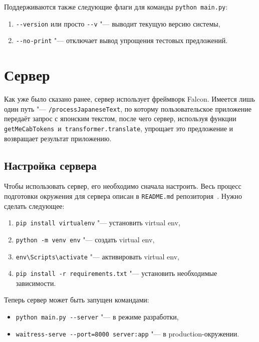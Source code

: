 Поддерживаются также следующие флаги для команды \texttt{python main.py}:
\begin{enumerate}[1.]%
  \item \texttt{-{}-version} или просто \texttt{-{}-v} "--- выводит текущую версию системы,
  \item \texttt{-{}-no-print}  "--- отключает вывод упрощения тестовых предложений.
\end{enumerate}


\section{Сервер}


Как уже было сказано ранее, сервер использует фреймворк Falcon.
Имеется лишь один путь "--- \texttt{/processJapaneseText}, по которму пользовательское приложение передаёт запрос с японским текстом, после чего сервер, используя функции \texttt{getMeCabTokens}~и~\texttt{transformer.translate}, упрощает это предложение и возвращает результат приложению.


\subsection{Настройка сервера}


Чтобы использовать сервер, его необходимо сначала настроить.
Весь процесс подготовки окружения для сервера описан в \texttt{README.md} репозитория~\cite{ServerGithub}.
Нужно сделать следующее:
\begin{enumerate}[1.]%
  \item \texttt{pip install virtualenv} "--- установить virtual env,
  \item \texttt{python -m venv env} "--- создать virtual env,
  \item \texttt{env\textbackslash{}Scripts\textbackslash{}activate} "--- активировать virtual env,
  \item \texttt{pip install -r requirements.txt} "--- установить необходимые зависимости.
\end{enumerate}

Теперь сервер может быть запущен командами:
\begin{itemize}%
  \item \texttt{python main.py -{}-server} "--- в режиме разработки,
  \item \texttt{waitress-serve -{}-port=8000 server:app} "--- в production-окружении.
\end{itemize}


